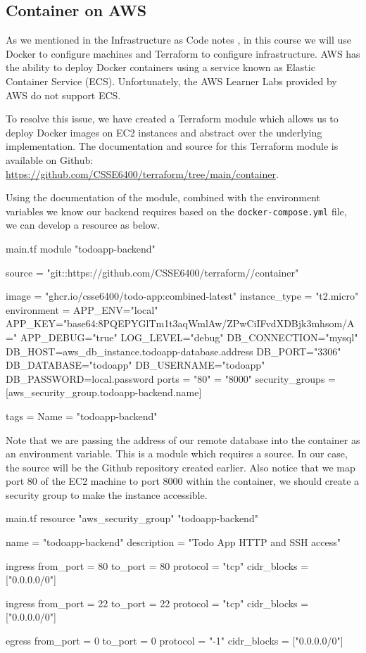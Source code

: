 \documentclass{csse4400}
\begin{document}
\subsection{Container on AWS}

As we mentioned in the Infrastructure as Code notes \cite{iac-notes},
in this course we will use Docker to configure machines and Terraform to configure infrastructure.
AWS has the ability to deploy Docker containers using a service known as Elastic Container Service (ECS).
Unfortunately, the AWS Learner Labs provided by AWS do not support ECS.

To resolve this issue,
we have created a Terraform module which allows us to deploy Docker images on EC2 instances and abstract over the underlying implementation.
The documentation and source for this Terraform module is available on Github: \url{https://github.com/CSSE6400/terraform/tree/main/container}.

Using the documentation of the module,
combined with the environment variables we know our backend requires based on the \texttt{docker-compose.yml} file,
we can develop a resource as below.

\begin{code}[language=terraform]{main.tf}
module "todoapp-backend" {
  source = "git::https://github.com/CSSE6400/terraform//container"
  
  image = "ghcr.io/csse6400/todo-app:combined-latest"
  instance_type = "t2.micro"
  environment = {
    APP_ENV="local"
    APP_KEY="base64:8PQEPYGlTm1t3aqWmlAw/ZPwCiIFvdXDBjk3mhsom/A="
    APP_DEBUG="true"
    LOG_LEVEL="debug"
    DB_CONNECTION="mysql"
    DB_HOST=aws_db_instance.todoapp-database.address
    DB_PORT="3306"
    DB_DATABASE="todoapp"
    DB_USERNAME="todoapp"
    DB_PASSWORD=local.password
  }
  ports = {
    "80" = "8000"
  }
  security_groups = [aws_security_group.todoapp-backend.name]

  tags = {
    Name = "todoapp-backend"
  }
}
\end{code}

Note that we are passing the address of our remote database into the container as an environment variable.
This is a module which requires a source.
In our case, the source will be the Github repository created earlier.
Also notice that we map port 80 of the EC2 machine to port 8000 within the container,
we should create a security group to make the instance accessible.

\begin{code}[language=terraform]{main.tf}
resource "aws_security_group" "todoapp-backend" {
  name = "todoapp-backend"
  description = "Todo App HTTP and SSH access"

  ingress {
    from_port = 80
    to_port = 80
    protocol = "tcp"
    cidr_blocks = ["0.0.0.0/0"]
  }

  ingress {
    from_port = 22
    to_port = 22
    protocol = "tcp"
    cidr_blocks = ["0.0.0.0/0"]
  }

  egress {
    from_port = 0
    to_port = 0
    protocol = "-1"
    cidr_blocks = ["0.0.0.0/0"]
  }
}
\end{code}
\end{document}

